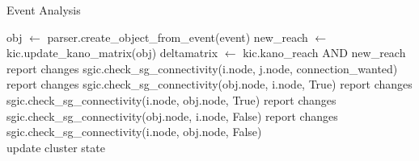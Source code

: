 \begin{algorithm}
    \caption{Event Analysis}
    \label{algo:analyzer}
    \begin{algorithmic}[1]
        \State obj $\gets$ parser.create\_object\_from\_event(event)
        \State new\_reach $\gets$ kic.update\_kano\_matrix(obj)
            \State deltamatrix $\gets$ kic.kano\_reach AND new\_reach
                    \State report changes
                    \State sgic.check\_sg\_connectivity(i.node, j.node, connection\_wanted)
                \EndFor
            \EndIf
            \\
                        \State report changes
                        \State sgic.check\_sg\_connectivity(obj.node, i.node, True)
                    \EndIf
                        \State report changes
                        \State sgic.check\_sg\_connectivity(i.node, obj.node, True)
                    \EndIf
                \EndFor
                        \State report changes
                        \State sgic.check\_sg\_connectivity(obj.node, i.node, False)
                    \EndIf
                        \State report changes
                        \State sgic.check\_sg\_connectivity(i.node, obj.node, False)
                    \EndIf
                \EndFor
            \EndIf
        \EndIf
        \\
        \State update cluster state
    \EndFunction
  \end{algorithmic}
\end{algorithm}

